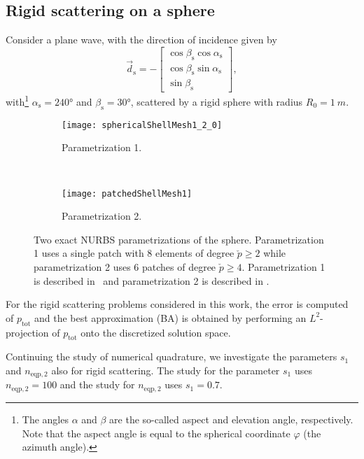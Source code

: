 \subsection{Rigid scattering on a sphere} 
Consider a plane wave, with the direction of incidence given by
\begin{equation}\label{Eq3:d_s}
	\vec{d}_{\mathrm{s}} = -\begin{bmatrix}
		\cos\beta_{\mathrm{s}}\cos\alpha_{\mathrm{s}}\\
		\cos\beta_{\mathrm{s}}\sin\alpha_{\mathrm{s}}\\
		\sin\beta_{\mathrm{s}}
	\end{bmatrix},
\end{equation}
with\footnote{The angles $\alpha$ and $\beta$ are the so-called aspect and elevation angle, respectively. Note that the aspect angle is equal to the spherical coordinate $\varphi$ (the azimuth angle).} $\alpha_{\mathrm{s}} = \ang{240}$ and $\beta_{\mathrm{s}} = \ang{30}$, scattered by a rigid sphere with radius $R_0=\SI{1}{m}$. 
\begin{figure}
	\centering
	\begin{subfigure}[t]{0.3\textwidth}
		\texttt{[image: sphericalShellMesh1\_2\_0]}
		\caption{Parametrization 1.}
		\label{Fig3:parm1}
	\end{subfigure} 
	~
	\begin{subfigure}[t]{0.3\textwidth}
		\texttt{[image: patchedShellMesh1]}
		\caption{Parametrization 2.}
		\label{Fig3:parm2}
	\end{subfigure} 
	\caption{Two exact NURBS parametrizations of the sphere. Parametrization 1 uses a single patch with 8 elements of degree $\check{p}\geq 2$ while parametrization 2 uses 6 patches of degree $\check{p}\geq 4$. Parametrization 1 is described in~ and parametrization 2 is described in .}
	\label{Fig3:SphericalShellParametrizations}
\end{figure}

For the rigid scattering problems considered in this work, the error is computed of $p_{\mathrm{tot}}$ and the best approximation (BA) is obtained by performing an $L^2$-projection of $p_{\mathrm{tot}}$ onto the discretized solution space. 

Continuing the study of numerical quadrature, we investigate the parameters $s_1$ and $n_{\mathrm{eqp},2}$ also for rigid scattering. The study for the parameter $s_1$ uses $n_{\mathrm{eqp},2}=100$ and the study for $n_{\mathrm{eqp},2}$ uses $s_1=0.7$. 

